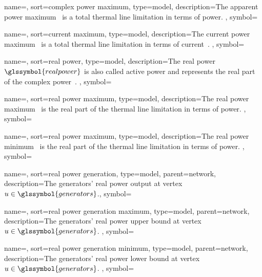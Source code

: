 {
    name={\complexpowermax},
    sort={complex power maximum},
    type={model},
    description={The apparent power maximum~ is a
    total thermal line limitation in terms of power. },
    symbol={\complexpowermax}
}

{
    name={\currentmax},
    sort={current maximum},
    type={model},
    description={The current power maximum~ is a total
    thermal line limitation in terms of current~. },
    symbol={\currentmax}
}

{
    name={\realpower},
    sort={real power},
    type={model},
    description={The real power~$\glssymbol{realpower}$ is also called active power and
    represents the real part of the complex power~.
    },
    symbol={\realpower}
}

{
    name={\realpowermax},
    sort={real power maximum},
    type={model},
    description={The real power maximum~ is the real
    part of the thermal line limitation in terms of power.
    }, 
    symbol={\realpowermax}
}

{
    name={\realpowermin},
    sort={real power maximum},
    type={model},
    description={The real power minimum~ is the real
    part of the thermal line limitation in terms of power.
    }, 
    symbol={\realpowermin}
}

{
    name={\realpowergeneration},
    sort={real power generation},
    type={model},
    parent={network},
    description={The generators' real power output at vertex~$\vertexa \in
    \glssymbol{generators}$.},
    symbol={\realpowergeneration}
}

{
    name={\realpowergenerationmax},
    sort={real power generation maximum},
    type={model},
    parent={network},
    description={The generators' real power upper bound at vertex~$\vertexa \in
    \glssymbol{generators}$.
    },
    symbol={\realpowergenerationmax}
}

{
    name={\realpowergenerationmin},
    sort={real power generation minimum},
    type={model},
    parent={network},
    description={The generators' real power lower bound at vertex~$\vertexa \in
    \glssymbol{generators}$.
    },
    symbol={\realpowergenerationmin}
}

